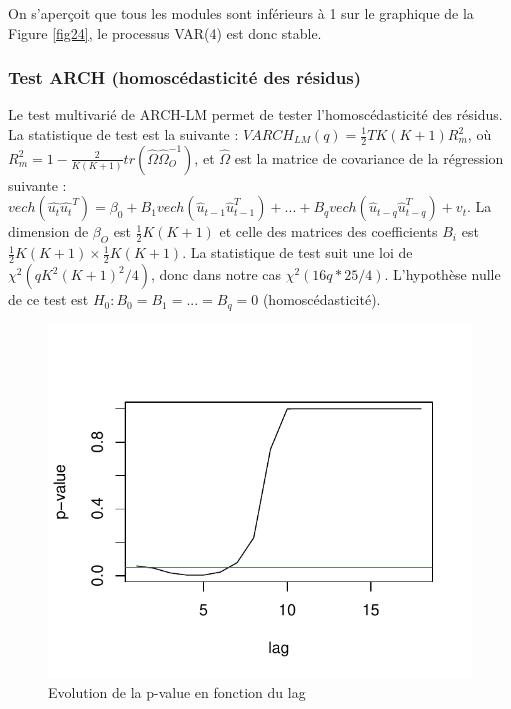\documentclass[11pt,]{article}
\begin{document}
On s'aperçoit que tous les modules sont inférieurs à 1 sur le graphique
de la Figure \ref{fig24}, le processus VAR(4) est donc stable.

\subsubsection{Test ARCH (homoscédasticité des
résidus)}\label{test-arch-homoscedasticite-des-residus}

Le test multivarié de ARCH-LM permet de tester l'homoscédasticité des
résidus. La statistique de test est la suivante :
\(VARCH_{LM}(q) = \frac{1}{2}TK(K+1)R_m^2\), où
\(R_m^2 = 1 - \frac{2}{K(K+1)}tr(\hat{\Omega}\hat{\Omega}_O^{-1})\), et
\(\hat{\Omega}\) est la matrice de covariance de la régression suivante
:
\(vech(\hat{u_t}\hat{u_t}^T) = \beta_0 + B_1 vech(\hat{u}_{t-1}\hat{u}_{t-1}^T) + ... + B_q vech(\hat{u}_{t-q}\hat{u}_{t-q}^T) + v_t\).
La dimension de \(\beta_O\) est \(\frac{1}{2}K(K+1)\) et celle des
matrices des coefficients \(B_i\) est
\(\frac{1}{2}K(K+1) × \frac{1}{2}K(K+1)\). La statistique de test suit
une loi de \(\chi^2(qK^2(K+1)^2/4)\), donc dans notre cas
\(\chi^2(16q*25/4)\). L'hypothèse nulle de ce test est
\(H_0 : B_0 = B_1 = ... = B_q = 0\) (homoscédasticité).

\begin{figure}[htbp]
\centering
\includegraphics{Rapport_final_files/figure-latex/unnamed-chunk-39-1.pdf}
\caption{\label{fig25} Evolution de la p-value en fonction du lag}
\end{figure}
\end{document}
